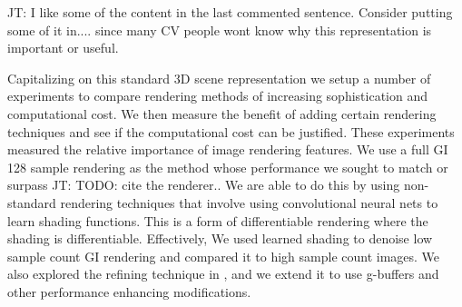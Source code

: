 \documentclass[10pt,twocolumn,letterpaper]{article}
\newcommand{\tompson}[1]{{\color{green} JT: #1}}
\begin{document}


\tompson{I like some of the content in the last commented sentence. Consider putting some of it in.... since many CV people wont know why this representation is important or useful.}

Capitalizing on this standard 3D scene representation we setup a number of experiments to compare rendering methods of increasing sophistication and computational cost.  We then measure the benefit of adding certain rendering techniques and see if the computational cost can be justified.  These experiments measured the relative importance of image rendering features. We use a full GI 128 sample rendering as the method whose performance we sought to match or surpass\tompson{TODO: cite the renderer.}.  We are able to do this by using non-standard rendering techniques that involve using convolutional neural nets to learn shading functions.  This is a form of differentiable rendering where the shading is differentiable. Effectively, We used learned shading to denoise low sample count GI rendering and compared it to high sample count images.  We also explored the refining technique in \cite{DBLP:journals/corr/ShrivastavaPTSW16}, and we extend it to use g-buffers and other performance enhancing modifications.
\end{document}
